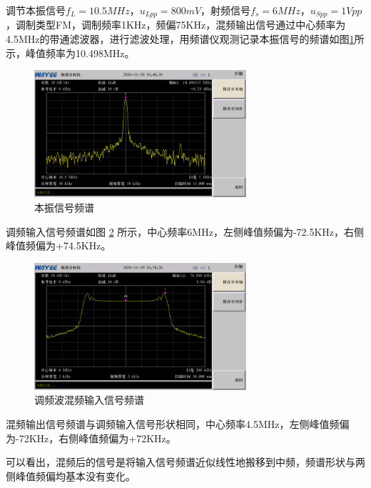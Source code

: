 \documentclass[UTF8]{ctexart}
\begin{document}
\begin{enumerate}
    调节本振信号$f_L=10.5MHz$，$u_{Lpp}=800mV$，射频信号$f_s=6MHz$，$u_{Spp}=1Vpp$，调制类型FM，调制频率1KHz，频偏75KHz，混频输出信号通过中心频率为4.5MHz的带通滤波器，进行滤波处理，用频谱仪观测记录本振信号的频谱如图\ref{fig:13}所示，峰值频率为10.498MHz。
    \begin{figure}[H]
        \centering
        \includegraphics[width=0.7\textwidth]{pics/13.png}

        \caption{本振信号频谱}\label{fig:13}
    \end{figure}
    \vspace{-2em}
    调频输入信号频谱如图 \ref{fig:14} 所示，中心频率6MHz，左侧峰值频偏为-72.5KHz，右侧峰值频偏为+74.5KHz。
    \begin{figure}[H]
        \centering
        \includegraphics[width=0.7\textwidth]{pics/14.png}

        \caption{调频波混频输入信号频谱}\label{fig:14}
    \end{figure}
    \vspace{-1em}
    混频输出信号频谱与调频输入信号形状相同，中心频率4.5MHz，左侧峰值频偏为-72KHz，右侧峰值频偏为+72KHz。

    可以看出，混频后的信号是将输入信号频谱近似线性地搬移到中频，频谱形状与两侧峰值频偏均基本没有变化。
\end{enumerate}
\end{document}
